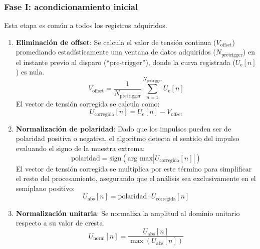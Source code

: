 \subsubsection{Fase I: acondicionamiento inicial}

Esta etapa es común a todos los registros adquiridos.
\begin{enumerate}
    \item \textbf{Eliminación de offset}: Se calcula el valor de tensión continua ($V_{\text{offset}}$) promediando estadísticamente una ventana de datos adquiridos ($N_{\text{pretrigger}}$) en el instante previo al disparo (``pre-trigger''), donde la curva registrada ($U_\text{e}[n]$) es nula.
    \begin{equation}
        V_{\text{offset}} = \frac{1}{N_{\text{pretrigger}}} \sum_{n=1}^{N_{\text{pretrigger}}} U_\text{e}[n]
        \label{eq:calculo_offset}
    \end{equation}
    El vector de tensión corregida se calcula como:
    \begin{equation}
        U_{\text{corregida}}[n] = U_\text{e}[n] - V_{\text{offset}}
        \label{eq:eliminacion_offset}
    \end{equation}
    \item \textbf{Normalización de polaridad}: Dado que los impulsos pueden ser de polaridad positiva o negativa, el algoritmo detecta el sentido del impulso evaluando el signo de la muestra extrema:
    \begin{equation}
        \text{polaridad} = \text{sign}(\text{arg max} |U_{\text{corregida}}
        [n]|)
        \label{eq:buscar_polaridad}
    \end{equation}
    El vector de tensión corregida se multiplica por este término para simplificar el resto del procesamiento, asegurando que el análisis sea exclusivamente en el semiplano positivo:
    \begin{equation}
        U_{\text{abs}}[n] = \text{polaridad} \cdot U_{\text{corregida}}[n]
        \label{eq:normalizacion_polaridad}
    \end{equation}
    \item \textbf{Normalización unitaria}: Se normaliza la amplitud al dominio unitario respecto a su valor de cresta.
    \begin{equation}
        U_{\text{norm}}[n] = \frac{U_{\text{abs}}[n]}{\max(U_{\text{abs}}[n])}
        \label{eq:onda_normalizada}
    \end{equation}
\end{enumerate}

